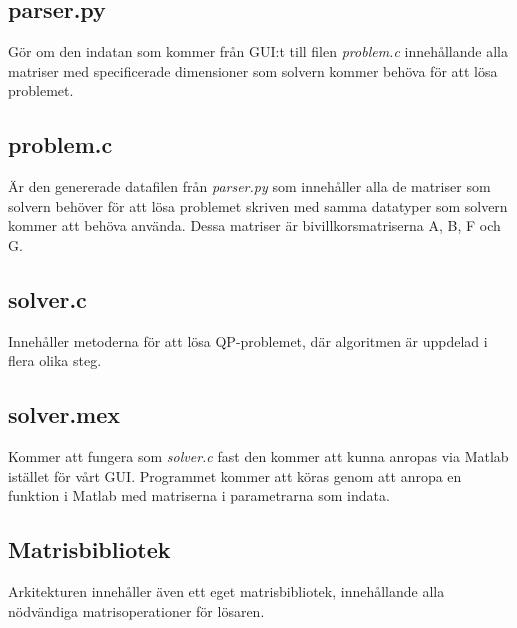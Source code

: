 \subsection{parser.py}
Gör om den indatan som kommer från GUI:t till filen \textit{problem.c} innehållande alla matriser med specificerade dimensioner som solvern kommer behöva för att lösa problemet.

\subsection{problem.c}
Är den genererade datafilen från \textit{parser.py} som innehåller alla de matriser som solvern behöver för att lösa problemet skriven med samma datatyper som solvern kommer att behöva använda. Dessa matriser är bivillkorsmatriserna A, B, F och G.  

\subsection{solver.c}
Innehåller metoderna för att lösa QP-problemet, där algoritmen är uppdelad i flera olika steg.

\subsection{solver.mex}
Kommer att fungera som \textit{solver.c} fast den kommer att kunna anropas via Matlab istället för vårt GUI. Programmet kommer att köras genom att anropa en funktion i Matlab med matriserna i parametrarna som indata.


\subsection{Matrisbibliotek}
Arkitekturen innehåller även ett eget matrisbibliotek, innehållande alla nödvändiga matrisoperationer för lösaren.

